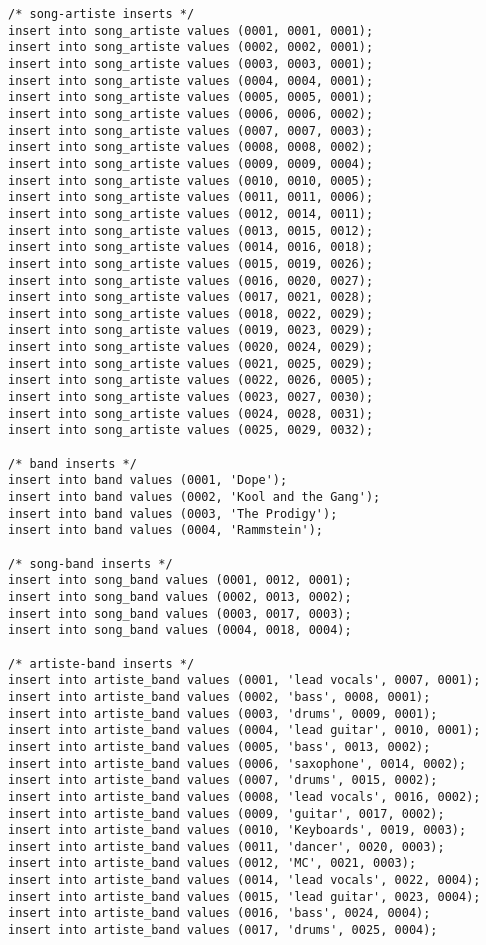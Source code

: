 \documentclass[12pt]{article}
\begin{document}
\begin{lstlisting}
/* song-artiste inserts */
insert into song_artiste values (0001, 0001, 0001);
insert into song_artiste values (0002, 0002, 0001);
insert into song_artiste values (0003, 0003, 0001);
insert into song_artiste values (0004, 0004, 0001);
insert into song_artiste values (0005, 0005, 0001);
insert into song_artiste values (0006, 0006, 0002);
insert into song_artiste values (0007, 0007, 0003);
insert into song_artiste values (0008, 0008, 0002);
insert into song_artiste values (0009, 0009, 0004);
insert into song_artiste values (0010, 0010, 0005);
insert into song_artiste values (0011, 0011, 0006);
insert into song_artiste values (0012, 0014, 0011);
insert into song_artiste values (0013, 0015, 0012);
insert into song_artiste values (0014, 0016, 0018);
insert into song_artiste values (0015, 0019, 0026);
insert into song_artiste values (0016, 0020, 0027);
insert into song_artiste values (0017, 0021, 0028);
insert into song_artiste values (0018, 0022, 0029);
insert into song_artiste values (0019, 0023, 0029);
insert into song_artiste values (0020, 0024, 0029);
insert into song_artiste values (0021, 0025, 0029);
insert into song_artiste values (0022, 0026, 0005);
insert into song_artiste values (0023, 0027, 0030);
insert into song_artiste values (0024, 0028, 0031);
insert into song_artiste values (0025, 0029, 0032);

/* band inserts */
insert into band values (0001, 'Dope');
insert into band values (0002, 'Kool and the Gang');
insert into band values (0003, 'The Prodigy');
insert into band values (0004, 'Rammstein');

/* song-band inserts */
insert into song_band values (0001, 0012, 0001);
insert into song_band values (0002, 0013, 0002);
insert into song_band values (0003, 0017, 0003);
insert into song_band values (0004, 0018, 0004);

/* artiste-band inserts */
insert into artiste_band values (0001, 'lead vocals', 0007, 0001);
insert into artiste_band values (0002, 'bass', 0008, 0001);
insert into artiste_band values (0003, 'drums', 0009, 0001);
insert into artiste_band values (0004, 'lead guitar', 0010, 0001);
insert into artiste_band values (0005, 'bass', 0013, 0002);
insert into artiste_band values (0006, 'saxophone', 0014, 0002);
insert into artiste_band values (0007, 'drums', 0015, 0002);
insert into artiste_band values (0008, 'lead vocals', 0016, 0002);
insert into artiste_band values (0009, 'guitar', 0017, 0002);
insert into artiste_band values (0010, 'Keyboards', 0019, 0003);
insert into artiste_band values (0011, 'dancer', 0020, 0003);
insert into artiste_band values (0012, 'MC', 0021, 0003);
insert into artiste_band values (0014, 'lead vocals', 0022, 0004);
insert into artiste_band values (0015, 'lead guitar', 0023, 0004);
insert into artiste_band values (0016, 'bass', 0024, 0004);
insert into artiste_band values (0017, 'drums', 0025, 0004);
\end{lstlisting}
\newpage
\end{document}
